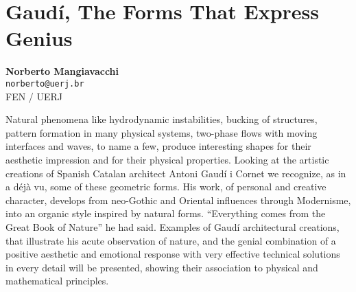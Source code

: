 
\section{Gaudí, The Forms That Express Genius}

\textbf{Norberto Mangiavacchi}\\
\texttt{\small{norberto@uerj.br}}\\
FEN / UERJ

Natural phenomena like hydrodynamic instabilities, bucking of
structures, pattern formation in many physical systems, two-phase flows
with moving interfaces and waves, to name a few, produce interesting
shapes for their aesthetic impression and for their physical properties.
Looking at the artistic creations of Spanish Catalan architect Antoni
Gaud\'i i Cornet we recognize, as in a d\'ej\`a vu, some of these
geometric forms. His work, of personal and creative character, develops
from neo-Gothic and Oriental influences through Modernisme, into an
organic style inspired by natural forms. ``Everything comes from the
Great Book of Nature'' he had said. Examples of Gaud\'i architectural
creations, that illustrate his acute observation of nature, and the
genial combination of a positive aesthetic and emotional response with
very effective technical solutions in every detail will be presented,
showing their association to physical and mathematical principles.


